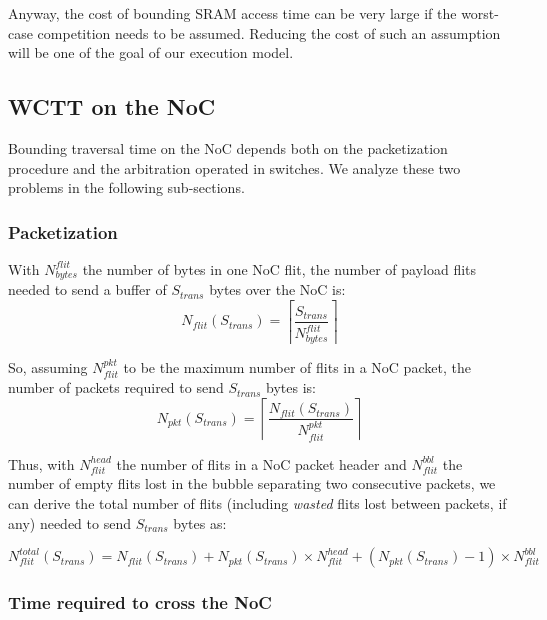 \documentclass[main.tex]{subfiles}
\begin{document}
Anyway, the cost of bounding SRAM access time can be very large if the
worst-case competition needs to be assumed. Reducing the cost of such an
assumption will be one of the goal of our execution model.


\subsection{WCTT on the NoC} \label{ssec_execModel_WCTTNoC} Bounding traversal
time on the NoC depends both on the packetization procedure and the arbitration
operated in switches. We analyze these two problems in the following
sub-sections.


\subsubsection{Packetization}
With $N_{bytes}^{flit}$ the number of bytes in one NoC flit, the number of 
payload flits needed to send a buffer of $S_{trans}$ bytes over the NoC is:
\begin{displaymath}
    N_{flit} ( S_{trans} ) = 
    \left\lceil \dfrac{S_{trans}}{N_{bytes}^{flit}} \right\rceil
\end{displaymath}

So, assuming $N_{flit}^{pkt}$ to be the maximum number of flits in a NoC packet,
the number of packets required to send $S_{trans}$ bytes is:
\begin{displaymath}
    N_{pkt} ( S_{trans} ) = 
    \left\lceil \dfrac{ N_{flit}(S_{trans}) }{N_{flit}^{pkt}} \right\rceil
\end{displaymath}

Thus, with $N_{flit}^{head}$ the number of flits in a NoC packet header and
$N_{flit}^{bbl}$ the number of empty flits lost in the bubble separating two
consecutive packets, we can derive the total number of flits (including
\emph{wasted} flits lost between packets, if any) needed to send $S_{trans}$
bytes as:

\begin{displaymath}
    N_{flit}^{total} ( S_{trans} ) =
    N_{flit} ( S_{trans} ) +
    N_{pkt} ( S_{trans} ) \times N_{flit}^{head} +
    (N_{pkt} ( S_{trans} ) - 1) \times N_{flit}^{bbl}
\end{displaymath}


\subsubsection{Time required to cross the NoC}
\label{sssec_execModel_NoCbounds}
\end{document}
